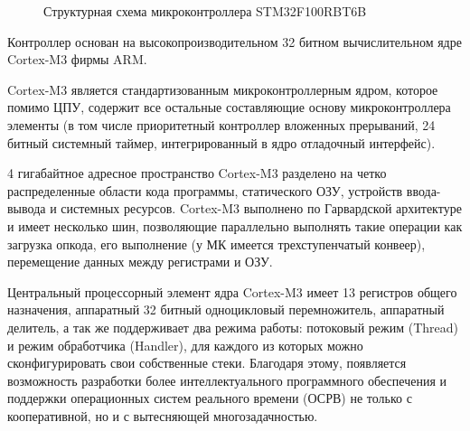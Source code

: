         \begin{figure}
            \caption{Структурная схема микроконтроллера STM32F100RBT6B}
            \label{fig:stm32f100rbt6b}
        \end{figure}       
        
        Контроллер основан на высокопроизводительном 32 битном вычислительном
        ядре Cortex-M3 фирмы ARM.

        Cortex-M3 является стандартизованным микроконтроллерным ядром, которое
        помимо ЦПУ, содержит все остальные составляющие основу микроконтроллера
        элементы (в том числе приоритетный контроллер вложенных прерываний, 24
        битный системный таймер, интегрированный в ядро отладочный интерфейс). 

        4 гигабайтное адресное пространство Cortex-M3 разделено на четко
        распределенные области кода программы, статического ОЗУ, устройств
        ввода-вывода и системных ресурсов. Cortex-M3 выполнено по Гарвардской
        архитектуре и  имеет несколько шин, позволяющие параллельно выполнять
        такие операции как загрузка опкода, его выполнение (у МК имеется
        трехступенчатый конвеер), перемещение данных между регистрами и ОЗУ.

        Центральный процессорный элемент ядра Cortex-M3 имеет 13 регистров
        общего назначения, аппаратный 32 битный одноцикловый перемножитель,
        аппаратный делитель, а так же поддерживает два режима работы: потоковый
        режим (Thread) и режим обработчика (Handler), для каждого из которых
        можно сконфигурировать свои собственные стеки. Благодаря этому,
        появляется возможность разработки более интеллектуального программного
        обеспечения и поддержки операционных систем реального времени (ОСРВ) не
        только с кооперативной, но и с вытесняющей многозадачностью.

